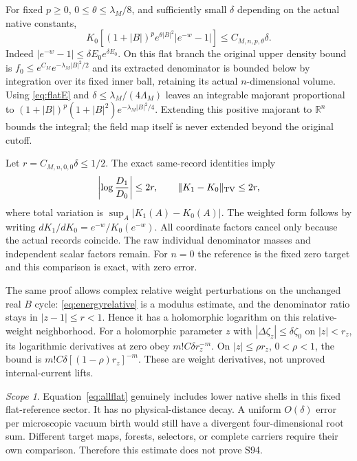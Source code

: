 \documentclass[11pt,letterpaper]{article}
\numberwithin{equation}{section}
\theoremstyle{plain}
\theoremstyle{remark}
\newtheorem{remark}[theorem]{Scope}
\newcommand{\R}{\mathbb R}
\begin{document}
For fixed $p\ge0$, $0\le\theta\le\lambda_M/8$, and sufficiently small
$\delta$ depending on the actual native constants,
\begin{equation}
 K_0\left[(1+|B|)^pe^{\theta|B|^2}|e^{-w}-1|\right]
 \le C_{M,n,p,\theta}\delta.
 \label{eq:allflat}
\end{equation}
Indeed $|e^{-w}-1|\le\delta E_0e^{\delta E_0}$.
On this flat branch the original upper density bound is
$f_0\le e^{C_M}e^{-\lambda_M|B|^2/2}$ and its extracted denominator is bounded
below by integration over its fixed inner ball, retaining its actual
$n$-dimensional volume. Using \eqref{eq:flatE} and
$\delta\le\lambda_M/(4\Lambda_M)$ leaves an integrable majorant proportional
to $(1+|B|)^p(1+|B|^2)e^{-\lambda_M|B|^2/4}$.
Extending this positive majorant to $\R^n$ bounds the integral; the field map
itself is never extended beyond the original cutoff.

Let $r=C_{M,n,0,0}\delta\le1/2$. The exact same-record identities imply
\begin{equation}
 \left|\log\frac{D_1}{D_0}\right|\le2r,
 \qquad \|K_1-K_0\|_{\rm TV}\le2r,
 \label{eq:allflatratio}
\end{equation}
where total variation is $\sup_A|K_1(A)-K_0(A)|$.
The weighted form follows by writing
$dK_1/dK_0=e^{-w}/K_0(e^{-w})$.
All coordinate factors cancel only because the actual records coincide.
The raw individual denominator masses and independent scalar factors remain.
For $n=0$ the reference is the fixed zero target and this comparison is exact,
with zero error.

The same proof allows complex relative weight perturbations on the unchanged
real $B$ cycle: \eqref{eq:energyrelative} is a modulus estimate, and the denominator
ratio stays in $|z-1|\le r<1$. Hence it has a holomorphic logarithm on this
relative-weight neighborhood. For a holomorphic parameter $z$ with
$|\Delta\zeta_z|\le\delta\zeta_0$ on $|z|<r_z$, its logarithmic derivatives
at zero obey $m!C\delta r_z^{-m}$. On $|z|\le\rho r_z$, $0<\rho<1$, the bound
is $m!C\delta[(1-\rho)r_z]^{-m}$.
These are weight derivatives, not unproved internal-current lifts.

\begin{remark}
Equation~\eqref{eq:allflat} genuinely includes lower native shells in this
fixed flat-reference sector. It has no physical-distance decay. A uniform
$O(\delta)$ error per microscopic vacuum birth would still have a divergent
four-dimensional root sum. Different target maps, forests, selectors, or
complete carriers require their own comparison. Therefore this estimate
does not prove S94.
\end{remark}
\end{document}
